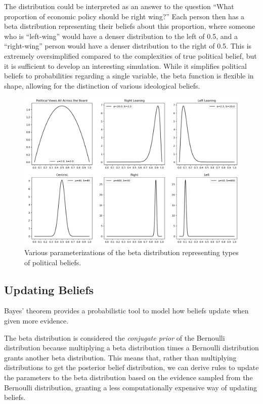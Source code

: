 \documentclass[11pt]{article}
\begin{document}
The distribution could be interpreted as an answer to the question “What proportion of economic policy should be right wing?” Each person then has a beta distribution representing their beliefs about this proportion, where someone who is “left-wing” would have a denser distribution to the left of 0.5, and a “right-wing” person would have a denser distribution to the right of 0.5. This is extremely oversimplified compared to the complexities of true political belief, but it is sufficient to develop an interesting simulation. While it simplifies political beliefs to probabilities regarding a single variable, the beta function is flexible in shape, allowing for the distinction of various ideological beliefs.

\begin{figure}[h]
\centering
\includegraphics[scale=0.5]{images/modeling_beliefs.png}
\caption{Various parameterizations of the beta distribution representing types of political beliefs.}
\end{figure}

\subsection{Updating Beliefs}

Bayes' theorem provides a probabilistic tool to model how beliefs update when given more evidence. 

The beta distribution is considered the \textit{conjugate prior} of the Bernoulli distribution because multiplying a beta distribution times a Bernoulli distribution grants another beta distribution. This means that, rather than multiplying distributions to get the posterior belief distribution, we can derive rules to update the parameters to the beta distribution based on the evidence sampled from the Bernoulli distribution, granting a less computationally expensive way of updating beliefs.
\end{document}
